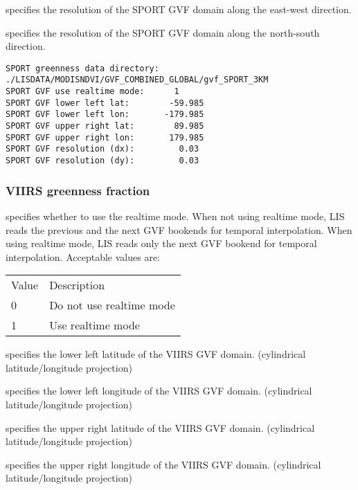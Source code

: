   specifies the resolution of the 
 SPORT GVF domain along the east-west direction.

  specifies the resolution of the 
 SPORT GVF domain along the north-south direction.
 

 \begin{Verbatim}[frame=single]
SPORT greenness data directory:  ./LISDATA/MODISNDVI/GVF_COMBINED_GLOBAL/gvf_SPORT_3KM
SPORT GVF use realtime mode:      1
SPORT GVF lower left lat:        -59.985
SPORT GVF lower left lon:       -179.985
SPORT GVF upper right lat:        89.985
SPORT GVF upper right lon:       179.985
SPORT GVF resolution (dx):         0.03
SPORT GVF resolution (dy):         0.03
 \end{Verbatim}

 
 \subsubsection{VIIRS greenness fraction}
 \label{sssec:viirsgreenness}
 

 
  specifies whether to use the
 realtime mode.  When not using realtime mode, LIS reads the
 previous and the next GVF bookends for temporal interpolation.
 When using realtime mode, LIS reads only the next GVF bookend
 for temporal interpolation.
 Acceptable values are:

 \begin{tabular}{ll}
 Value & Description              \\
 0     & Do not use realtime mode \\
 1     & Use realtime mode        \\
 \end{tabular}

  specifies the lower left latitude
 of the VIIRS GVF domain.
 (cylindrical latitude/longitude projection)

  specifies the lower left
 longitude of the VIIRS GVF domain.
 (cylindrical latitude/longitude projection)

  specifies the upper right latitude
 of the VIIRS GVF domain.
 (cylindrical latitude/longitude projection)

  specifies the upper right
 longitude of the VIIRS GVF domain.
 (cylindrical latitude/longitude projection)


